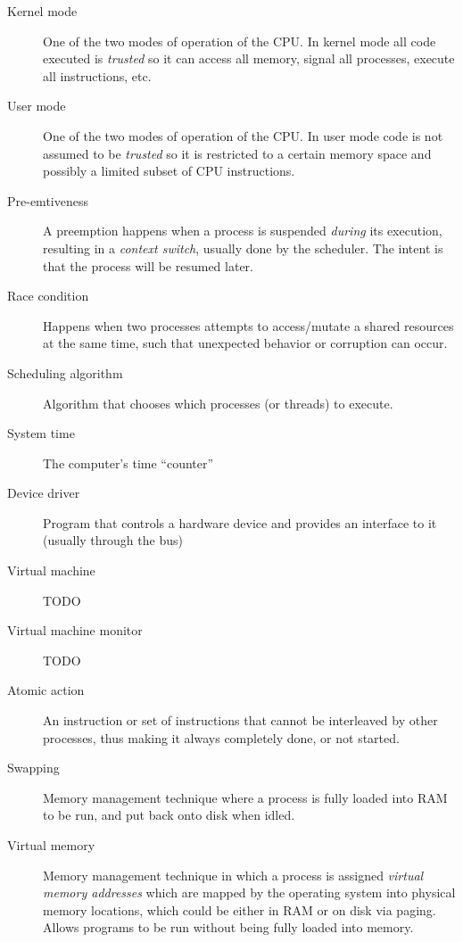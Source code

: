\documentclass{article}
\begin{document}
\begin{description}
\item[Kernel mode]
  One of the two modes of operation of the CPU. In kernel mode all code executed is \textit{trusted} so it can access all memory, signal all processes, execute all instructions, etc.

\item[User mode]
  One of the two modes of operation of the CPU. In user mode code is not assumed to be \textit{trusted} so it is restricted to a certain memory space and possibly a limited subset of CPU instructions.

\item[Pre-emtiveness]
  A preemption happens when a process is suspended \textit{during} its execution, resulting in a \textit{context switch}, usually done by the scheduler. The intent is that the process will be resumed later.

\item[Race condition]
  Happens when two processes attempts to access/mutate a shared resources at the same time, such that unexpected behavior or corruption can occur.

\item[Scheduling algorithm]
  Algorithm that chooses which processes (or threads) to execute.

\item[System time]
  The computer's time ``counter''

\item[Device driver]
  Program that controls a hardware device and provides an interface to it (usually through the bus)

\item[Virtual machine]
  TODO

\item[Virtual machine monitor]
  TODO

\item[Atomic action]
  An instruction or set of instructions that cannot be interleaved by other processes, thus making it always completely done, or not started.

\item[Swapping]
  Memory management technique where a process is fully loaded into RAM to be run, and put back onto disk when idled.

\item[Virtual memory]
  Memory management technique in which a process is assigned \emph{virtual memory addresses} which are mapped by the operating system into physical memory locations, which could be either in RAM or on disk via paging. Allows programs to be run without being fully loaded into memory.


\end{description}
\end{document}
